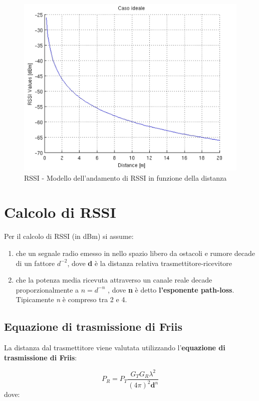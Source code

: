 \begin{figure}[!ht]
	\centering
	\includegraphics[scale=.25]{img/algoritmi/RSS.png}
	\caption{RSSI - Modello dell'andamento di RSSI in funzione della distanza}
\end{figure}

\section{Calcolo di RSSI}
Per il calcolo di RSSI (in dBm) si assume:
\begin{enumerate}
	\item che un segnale radio emesso in nello spazio libero da ostacoli e rumore decade di un fattore $ d^{-2} $, dove \textbf{d} è la distanza relativa trasmettitore-ricevitore
	
	\item che la potenza media ricevuta attraverso un canale reale decade proporzionalmente a $ n = d^{-n} $ , dove \textbf{n} è detto \textbf{l’esponente path-loss}. Tipicamente \textit{n} è compreso tra 2 e 4.
\end{enumerate}

\subsection{Equazione di trasmissione di Friis}

La distanza dal trasmettitore viene valutata utilizzando l’\textbf{equazione di trasmissione di Friis}:

\begin{equation}\label{eq:potenza_ricevuta}
P_R = P_T \frac{G_T G_R  \lambda^2}{(4 \pi)^2 \textbf{d}^n}
\end{equation}
dove:


